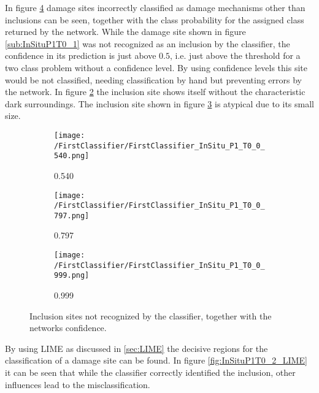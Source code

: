 In figure \ref{fig:FirstClassifierInSituP1T0} damage sites incorrectly classified as damage mechanisms other than inclusions can be seen, together with the class probability for the assigned class returned by the network. While the damage site shown in figure \ref{sub:InSituP1T0_1} was not recognized as an inclusion by the classifier, the confidence in its prediction is just above $0.5$, i.e. just above the threshold for a two class problem without a confidence level. By using confidence levels this site would be not classified, needing classification by hand but preventing errors by the network. In figure \ref{sub:InSituP1T0_2} the inclusion site shows itself without the characteristic dark surroundings. The inclusion site shown in figure \ref{sub:InSituP1T0_3} is atypical due to its small size.\\
\begin{figure}[H]
\centering
\begin{subfigure}{.3\textwidth}
\texttt{[image: /FirstClassifier/FirstClassifier\_InSitu\_P1\_T0\_0\_540.png]}
\caption{0.540}
\label{sub:InSituP1T10_1}
\end{subfigure}
\centering
\begin{subfigure}{.3\textwidth}
\texttt{[image: /FirstClassifier/FirstClassifier\_InSitu\_P1\_T0\_0\_797.png]}
\caption{0.797}
\label{sub:InSituP1T0_2}
\end{subfigure}
\centering
\begin{subfigure}{.3\textwidth}
\texttt{[image: /FirstClassifier/FirstClassifier\_InSitu\_P1\_T0\_0\_999.png]}
\caption{0.999}
\label{sub:InSituP1T0_3}
\end{subfigure}
\caption{Inclusion sites not recognized by the classifier, together with the networks confidence.}
\label{fig:FirstClassifierInSituP1T0}
\end{figure}

By using LIME as discussed in \ref{sec:LIME} the decisive regions for the classification of a damage site can be found. In figure \ref{fig:InSituP1T0_2_LIME} it can be seen that while the classifier correctly identified the inclusion, other influences lead to the misclassification. \\


